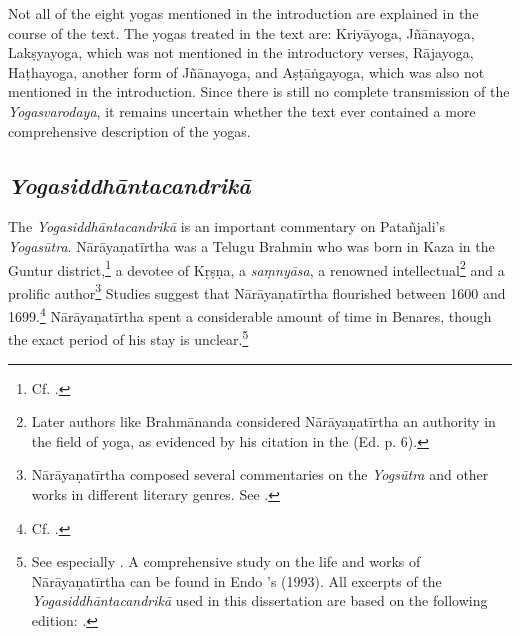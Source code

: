 Not all of the eight yogas mentioned in the introduction are explained in the course of the text. The yogas treated in the text are: Kriyāyoga, Jñānayoga, Lakṣyayoga, which was not mentioned in the introductory verses, Rājayoga, Haṭhayoga, another form of Jñānayoga, and Aṣṭāṅgayoga, which was also not mentioned in the introduction. Since there is still no complete transmission of the \emph{Yogasvarodaya}, it remains uncertain whether the text ever contained a more comprehensive description of the yogas.

\subsection{\emph{Yogasiddhāntacandrikā}}

The \emph{Yogasiddhāntacandrikā} is an important commentary on Patañjali's \emph{Yogasūtra}. Nārāyaṇatīrtha was a Telugu Brahmin who was born in Kaza in the Guntur district,\footnote{Cf. \citeauthor[1993: 43]{endo1993}.} a devotee of Kṛṣṇa, a \textit{saṃnyāsa}, a renowned intellectual\footnote{Later authors like Brahmānanda considered Nārāyaṇatīrtha an authority in the field of yoga, as evidenced by his citation in the  (Ed. p. 6).} and a prolific author\footnote{Nārāyaṇatīrtha composed several commentaries on the \emph{Yogsūtra} and other works in different literary genres. See \citeauthor[2004: 20-21]{penna2004}.} Studies suggest that Nārāyaṇatīrtha flourished between 1600 and 1699.\footnote{Cf. \citeauthor[1993: 56]{endo1993}.} Nārāyaṇatīrtha spent a considerable amount of time in Benares, though the exact period of his stay is unclear.\footnote{See especially \citeauthor[2004: 24]{penna2004}. A comprehensive study on the life and works of Nārāyaṇatīrtha can be found in Endo \citeauthor{endo1993}'s  (1993). All excerpts of the \emph{Yogasiddhāntacandrikā} used in this dissertation are based on the following edition: .}

